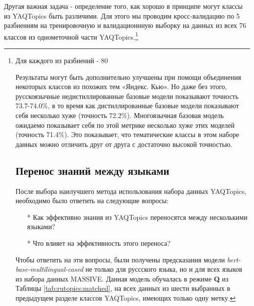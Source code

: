 Другая важная задача - определение того, как хорошо в принципе могут классы из {YAQTopics} быть различими. Для этого мы проводим кросс-валидацию по 5 разбиениям на тренировочную и валидационнную выборку на данных из всех 76 классов из однометочной части {YAQTopics}.\footnote{Для каждого из разбиений - 80%


\begin{table*}
\centering
\caption{Точность (Макро-F1) различных базовых моделей для 5-кратной кросс-валидации на всех классах из наборе данных {YAQTopics} при обучении только на вопросах.
 Базовые модели обозначаются как в Таблице~\ref{tab:rutopics:backbones}. Дисперсия не превосходит 0.65 для всех базовых моделей.}
\end{table*}

Результаты могут быть дополнительно улучшены при помощи объединения некоторых классов из похожих тем «Яндекс. Кью». Но даже без этого, русскоязычные недистиллированные базовые модели  показывают точность 73.7-74.0\%, в то время как дистиллированные базовые модели показывают себя несколько хуже (точность 72.2\%). Многоязычная базовая модель ожидаемо показывает себя по этой метрике несколько хуже этих моделей (точность 71.4\%). Это показывает, что тематические классы в этом наборе данных можно отличить друг от друга с достаточно высокой точностью.

\section{Перенос знаний между языками}
После выбора наилучшего метода использования набора данных {YAQTopics}, необходимо было ответить на следующие вопросы:
\begin{itemize}
\item[*]Как эффективно знания из {YAQTopics} переносятся между несколькими языками?
\item[*]Что влияет на эффективность этого переноса?
\end{itemize}
Чтобы ответить на эти вопросы, были получены предсказания модели \textit{bert-base-multilingual-cased} не только для руссского языка, но и для всех языков из набора данных {MASSIVE}. Данная модель обучалась в режиме \textbf{Q} из Таблицы \ref{tab:rutopics:matched}, на всех данных из шести выбранных в предыдущем разделе классов {YAQTopics}, имеющих только одну метку.

}
